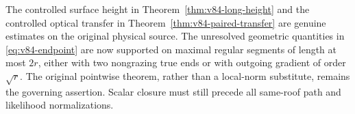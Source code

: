 The controlled surface height in Theorem~\ref{thm:v84-long-height}
and the controlled optical transfer in Theorem~\ref{thm:v84-paired-transfer}
are genuine estimates on the original physical source. The unresolved
geometric quantities in \eqref{eq:v84-endpoint} are now supported
on maximal regular segments of length at most $2r$, either with two
nongrazing true ends or with outgoing gradient of order $\sqrt r$.
The original pointwise theorem, rather than a local-norm substitute,
remains the governing assertion. Scalar closure must still precede
all same-roof path and likelihood normalizations.
